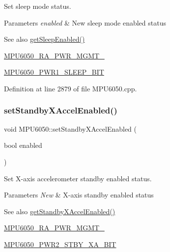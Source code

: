 Set sleep mode status. 
\begin{DoxyParams}{Parameters}
{\em enabled} & New sleep mode enabled status \\
\hline
\end{DoxyParams}
\begin{DoxySeeAlso}{See also}
\mbox{\hyperlink{classMPU6050_a196404ef04b959083d4bf5e6f1cd8b98}{get\+Sleep\+Enabled()}} 

\mbox{\hyperlink{MPU6050_8h_ac6c83146165a2307ac7155d4fa566df4}{M\+P\+U6050\+\_\+\+R\+A\+\_\+\+P\+W\+R\+\_\+\+M\+G\+M\+T\+\_}} 

\mbox{\hyperlink{MPU6050_8h_a303276044c71a042bb43d24a888104d9}{M\+P\+U6050\+\_\+\+P\+W\+R1\+\_\+\+S\+L\+E\+E\+P\+\_\+\+B\+IT}} 
\end{DoxySeeAlso}


Definition at line 2879 of file M\+P\+U6050.\+cpp.


\begin{DoxyCode}{0}

\end{DoxyCode}
\mbox{\label{classMPU6050_af4df87fd2e87f41d06706cfd5bbc2a2c}} 
\subsubsection{\texorpdfstring{setStandbyXAccelEnabled()}{setStandbyXAccelEnabled()}}
{\footnotesize\ttfamily void M\+P\+U6050\+::set\+Standby\+X\+Accel\+Enabled (\begin{DoxyParamCaption}\item[{bool}]{enabled }\end{DoxyParamCaption})}

Set X-\/axis accelerometer standby enabled status. 
\begin{DoxyParams}{Parameters}
{\em New} & X-\/axis standby enabled status \\
\hline
\end{DoxyParams}
\begin{DoxySeeAlso}{See also}
\mbox{\hyperlink{classMPU6050_a99261a04739fdb7a9a1c5b67ce3e710e}{get\+Standby\+X\+Accel\+Enabled()}} 

\mbox{\hyperlink{MPU6050_8h_aace6ce286da4d5f8c8f5ba6f80688e13}{M\+P\+U6050\+\_\+\+R\+A\+\_\+\+P\+W\+R\+\_\+\+M\+G\+M\+T\+\_}} 

\mbox{\hyperlink{MPU6050_8h_a94e69b1bac91c18489c5f1d59d9dcc54}{M\+P\+U6050\+\_\+\+P\+W\+R2\+\_\+\+S\+T\+B\+Y\+\_\+\+X\+A\+\_\+\+B\+IT}} 
\end{DoxySeeAlso}


